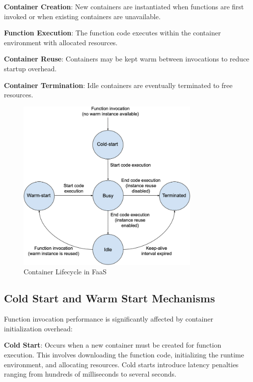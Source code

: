 \textbf{Container Creation}: New containers are instantiated when functions are first invoked or when existing containers are unavailable.

\textbf{Function Execution}: The function code executes within the container environment with allocated resources.

\textbf{Container Reuse}: Containers may be kept warm between invocations to reduce startup overhead.

\textbf{Container Termination}: Idle containers are eventually terminated to free resources.

\begin{figure}[h]
    \centering
    \includegraphics[width=0.8\textwidth]{assets/Life-cycle-state-diagram-of-a-function-instance.png}
    \caption{\small Container Lifecycle in FaaS ~\cite{moreno2023latency}}
    \label{fig:container_lifecycle}
\end{figure}


\subsection{Cold Start and Warm Start Mechanisms}

Function invocation performance is significantly affected by container initialization overhead:

\textbf{Cold Start}: Occurs when a new container must be created for function execution. This involves downloading the function code, initializing the runtime environment, and allocating resources. Cold starts introduce latency penalties ranging from hundreds of milliseconds to several seconds.

